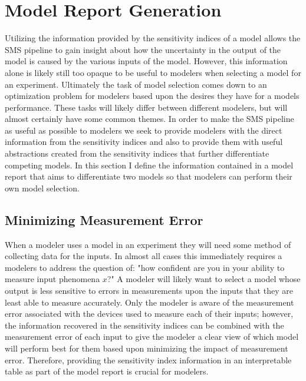 \section{Model Report Generation\label{sec:report_gen}}
Utilizing the information provided by the sensitivity indices of a model allows the SMS pipeline to gain insight about how the uncertainty in the output of the model is caused by the various inputs of the model.
However, this information alone is likely still too opaque to be useful to modelers when selecting a model for an experiment.
Ultimately the task of model selection comes down to an optimization problem for modelers based upon the desires they have for a models performance.
These tasks will likely differ between different modelers, but will almost certainly have some common themes.
In order to make the SMS pipeline as useful as possible to modelers we seek to provide modelers with the direct information from the sensitivity indices and also to provide them with useful abstractions created from the sensitivity indices that further differentiate competing models.
In this section I define the information contained in a model report that aims to differentiate two models so that modelers can perform their own model selection.

\subsection{Minimizing Measurement Error\label{sec:min_measure_error}}
When a modeler uses a model in an experiment they will need some method of collecting data for the inputs.
In almost all cases this immediately requires a modelers to address the question of: "how confident are you in your ability to measure input phenomena $x$?"
A modeler will likely want to select a model whose output is less sensitive to errors in measurements upon the inputs that they are least able to measure accurately.
Only the modeler is aware of the measurement error associated with the devices used to measure each of their inputs; however, the information recovered in the sensitivity indices can be combined with the measurement error of each input to give the modeler a clear view of which model will perform best for them based upon minimizing the impact of measurement error.
Therefore, providing the sensitivity index information in an interpretable table as part of the model report is crucial for modelers.

